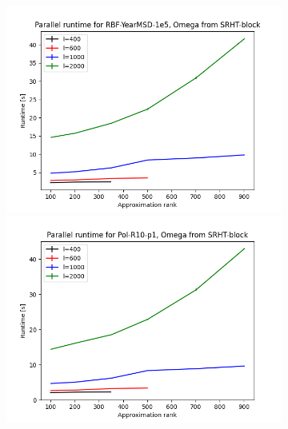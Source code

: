 \documentclass{article}
\theoremstyle{definition}
\begin{document}
\begin{figure}
\begin{subfigure}[t]{\textwidth+20pt\relax}
    \includegraphics[width=\dimexpr\linewidth-20pt\relax]{plots/runtime_new/runtime_par_RBF-YearMSD-1e5_SRHT-block.png}
    \includegraphics[width=\dimexpr\linewidth-20pt\relax]{plots/runtime_new/runtime_par_Pol-R10-p1_SRHT-block.png}

\end{subfigure}
\end{figure}
\end{document}
